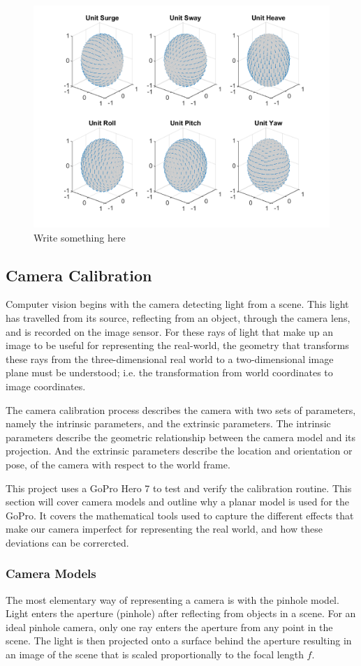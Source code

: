 \documentclass{UoNMCHA}
\numberwithin{equation}{section}
\begin{document}
\begin{figure}[ht]
    \begin{center}
        \includegraphics[width=.6\linewidth]{Figures/Unit_Movement}
        \caption{Write something here}
        \label{fig:Unit_Movement}
    \end{center}
\end{figure}

\subsection{Camera Calibration}\label{sec:Background_cameraCal} %
Computer vision begins with the camera detecting light from a scene. This light has travelled from its source, reflecting from an object, through the camera lens, and is recorded on the image sensor. For these rays of light that make up an image to be useful for representing the real-world, the geometry that transforms these rays from the three-dimensional real world to a two-dimensional image plane must be understood; i.e. the transformation from world coordinates to image coordinates.

The camera calibration process describes the camera with two sets of parameters, namely the intrinsic parameters, and the extrinsic parameters. The intrinsic parameters describe the geometric relationship between the camera model and its projection. And the extrinsic parameters describe the location and orientation or pose, of the camera with respect to the world frame.

This project uses a GoPro Hero 7 to test and verify the calibration routine. This section will cover camera models and outline why a planar model is used for the GoPro. It covers the mathematical tools used to capture the different effects that make our camera imperfect for representing the real world, and how these deviations can be corrercted.
\subsubsection{Camera Models}
The most elementary way of representing a camera is with the pinhole model. Light enters the aperture (pinhole) after reflecting from objects in a scene. For an ideal pinhole camera, only one ray enters the aperture from any point in the scene. The light is then projected onto a surface behind the aperture resulting in an image of the scene that is scaled proportionally to the focal length $f$.
\end{document}
